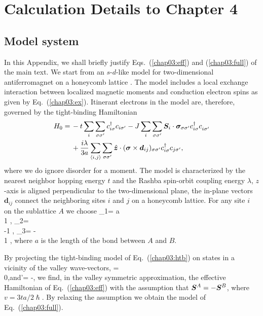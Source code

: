 \chapter{Calculation Details to Chapter 4}
\section{Model system}\label{chap03:sec:appa}

In this Appendix, we shall briefly justify Eqs.~(\ref{chap03:eff}) and (\ref{chap03:full}) of the main text. We start from an $s$-$d$-like model for two-dimensional antiferromagnet on a honeycomb lattice \cite{sumit2019}. The model includes a local exchange interaction between localized magnetic moments and conduction electron spins as given by Eq.~(\ref{chap03:ex}). Itinerant electrons in the model are, therefore, governed by the tight-binding Hamiltonian 
\begin{align}
H_0=\,&-t\sum\limits_{i}\s_{\sigma\sigma'}c_{i\sigma}^\dagger c_{i\sigma'}
-J \s_{i} \s_{\sigma\sigma'}\bb{S}_i\cdot \bb{\sigma}_{\sigma\sigma'}c^\dagger_{i\sigma}c\0_{i\sigma'}\n\\
&+\frac{i\lambda}{3a}\s_{\langle i,j\rangle}\sum\limits_{\sigma\sigma'}\hat{\bm{z}}\cdot(\bm{\sigma}\times\bm{d}_{ij})_{\sigma\sigma'}c_{i\sigma}^\dagger c_{j\sigma'},
\label{chap03:htb}
\end{align}
where we do ignore disorder for a moment. The model is characterized by the nearest neighbor hopping energy $t$ and the Rashba spin-orbit coupling energy $\lambda$, $z$-axis is aligned perpendicular to the two-dimensional plane, the in-plane vectors $\bm{d}_{ij}$ connect the neighboring sites $i$ and $j$ on a honeycomb lattice. For any site $i$ on the sublattice $A$ we choose
\be
{}_{1}= a  \\ 1 \epm, \quad {}_{2}=  \bpm {} \\ -1 \epm , \quad {}_{3}= - \bpm {}  \\ 1 \epm,
\e
where $a$ is the length of the bond between $A$ and $B$.

By projecting the tight-binding model of Eq.~(\ref{chap03:htb}) on states in a vicinity of the valley wave-vectors,
\be
{}= \\ 0\epm,\quad\mbox{and}\quad {}'= -,
\e
we find, in the valley symmetric approximation, the effective Hamiltonian of Eq.~(\ref{chap03:eff}) with the assumption that $\boldsymbol{S}^A=-\boldsymbol{S}^B$, where $v = 3ta/2\hslash$. By relaxing the assumption we obtain the model of Eq.~(\ref{chap03:full}).

